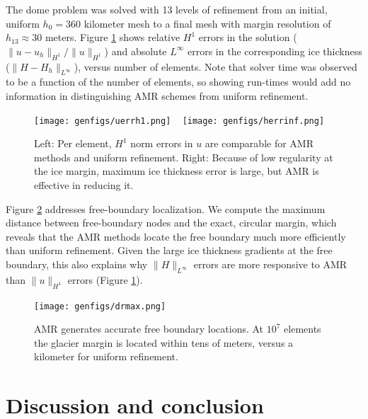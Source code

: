 \documentclass[]{interact}
\theoremstyle{plain}%
\theoremstyle{definition}
\theoremstyle{remark}
\begin{document}

The dome problem was solved with 13 levels of refinement from an initial, uniform $h_0=360$ kilometer mesh to a final mesh with margin resolution of $h_{13}\approx 30$ meters.  Figure \ref{fig:domenormresults} shows relative $H^1$ errors in the solution ($\|u-u_h\|_{H^1}/\|u\|_{H^1}$) and absolute $L^\infty$ errors in the corresponding ice thickness ($\|H-H_h\|_{L^\infty}$), versus number of elements.  Note that solver time was observed to be a function of the number of elements, so showing run-times would add no information in distinguishing AMR schemes from uniform refinement.

\begin{figure}[ht]
\noindent\mbox{\texttt{[image: genfigs/uerrh1.png]} \, \texttt{[image: genfigs/herrinf.png]}}
\caption{Left: Per element, $H^1$ norm errors in $u$ are comparable for AMR methods and uniform refinement.  Right: Because of low regularity at the ice margin, maximum ice thickness error is large, but AMR is effective in reducing it.}
\label{fig:domenormresults}
\end{figure}

Figure \ref{fig:domeradiusresults} addresses free-boundary localization.  We compute the maximum distance between free-boundary nodes and the exact, circular margin, which reveals that the AMR methods locate the free boundary much more efficiently than uniform refinement.  Given the large ice thickness gradients at the free boundary, this also explains why $\|H\|_{L^\infty}$ errors are more responsive to AMR than $\|u\|_{H^1}$ errors (Figure \ref{fig:domenormresults}).

\begin{figure}[ht]
\centering
\texttt{[image: genfigs/drmax.png]}
\caption{AMR generates accurate free boundary locations.  At $10^7$ elements the glacier margin is located within tens of meters, versus a kilometer for uniform refinement.}
\label{fig:domeradiusresults}
\end{figure}


\section{Discussion and conclusion} \label{sec:conclusion}
\end{document}
